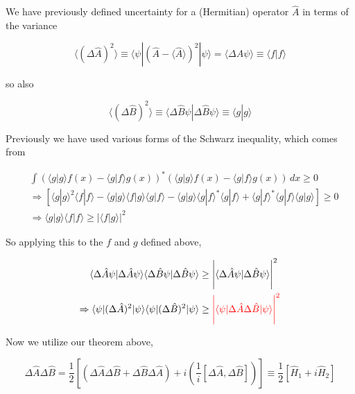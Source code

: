 We have previously defined uncertainty for a (Hermitian) operator $\hat{A}$ in
terms of the variance 

\[
 \langle (\Delta \hat{A})^2 \rangle \equiv \langle \psi | (\hat{A} - \langle
 \hat{A} \rangle )^2 | \psi\rangle = \langle \Delta \hat{A} \psi\rangle \equiv
 \langle f | f \rangle 
\] \vspace{3px}

so also 

\[
\langle ( \Delta \hat{B} )^2 \rangle \equiv \langle \Delta \hat{B}\psi | \Delta
\hat{B} \psi \rangle \equiv \langle g | g \rangle
\] \vspace{3px}

Previously we have used various forms of the Schwarz inequality, which comes
from 

\begin{align} \label{}
  &\int (\langle g |g\rangle f(x) - \langle g | f \rangle g(x))^* (\langle
  g | g \rangle f(x) - \langle g | f \rangle g(x) ) \, dx \geq 0 \\
  &\Rightarrow [\langle g | g \rangle^2 \langle f | f \rangle - \langle
  g | g \rangle \langle f | g \rangle \langle g | f \rangle - \langle
  g | g \rangle \langle g | f \rangle^* \langle g | f \rangle + \langle
  g | f\rangle^* \langle g | f\rangle \langle g | g \rangle ] \geq 0 \\
  &\Rightarrow \langle g | g \rangle \langle f | f \rangle \geq | \langle
  f | g \rangle |^2
\end{align}\vspace{3px}

So applying this to the $f$ and $g$ defined above, 

\begin{align} \label{}
  \langle \Delta \hat{A} \psi | \Delta \hat{A} \psi \rangle \langle \Delta
  \hat{B} \psi | \Delta \hat{B} \psi \rangle &\geq \Bigg| \langle \Delta
  \hat{A} \psi | \Delta \hat{B} \psi \rangle \Bigg|^2 \\
  \Rightarrow \langle \psi | (\Delta \hat{A})^2 |\psi\rangle \langle \psi
  | (\Delta \hat{B})^2 | \psi \rangle &\geq \textcolor{red}{\Bigg| \langle \psi
  | \Delta \hat{A} \Delta \hat{B} |\psi\rangle \Bigg|^2}
\end{align}\vspace{3px}

Now we utilize our theorem above, 

\[
\Delta \hat{A} \Delta \hat{B} = \frac{1}{2} \left[ (\Delta \hat{A} \Delta
  \hat{B} + \Delta \hat{B} \Delta \hat{A}) + i\left( \frac{1}{i} [\Delta
\hat{A}, \Delta \hat{B}] \right) \right] \equiv \frac{1}{2}
\left[\hat{H}_1 + i \hat{H}_2 \right]
\] \vspace{3px}


